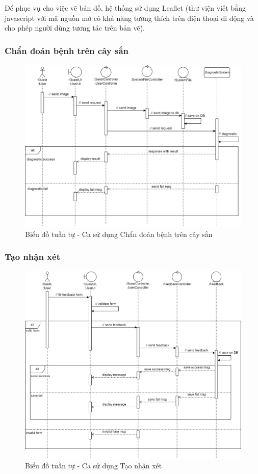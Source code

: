 \documentclass[./../main.tex]{subfiles}
\begin{document}
Để phục vụ cho việc vẽ bản đồ, hệ thống sử dụng Leaflet \cite{leafletjs} (thư viện viết bằng javascript với mã nguồn mở có khả năng tương thích trên điện thoại di động và cho phép người dùng tương tác trên bản vẽ).

\subsubsection{Chẩn đoán bệnh trên cây sắn}
\begin{figure}[H]
	\centering
	\includegraphics[width=\linewidth]{./img/uc12.png}
	\caption{Biểu đồ tuần tự - Ca sử dụng Chẩn đoán bệnh trên cây sắn}
\end{figure}

\subsubsection{Tạo nhận xét}
\begin{figure}[H]
	\centering
	\includegraphics[width=\linewidth]{./img/uc13.png}
	\caption{Biểu đồ tuần tự - Ca sử dụng Tạo nhận xét}
\end{figure}
\end{document}
